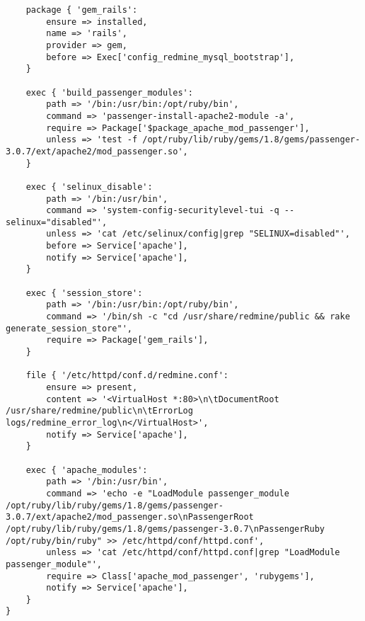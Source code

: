 \begin{code}
\begin{lstlisting}
	package { 'gem_rails':
		ensure => installed,
		name => 'rails',
		provider => gem,
		before => Exec['config_redmine_mysql_bootstrap'],
	}

	exec { 'build_passenger_modules':
		path => '/bin:/usr/bin:/opt/ruby/bin',
		command => 'passenger-install-apache2-module -a',
		require => Package['$package_apache_mod_passenger'],
		unless => 'test -f /opt/ruby/lib/ruby/gems/1.8/gems/passenger-3.0.7/ext/apache2/mod_passenger.so',
	}

	exec { 'selinux_disable':
		path => '/bin:/usr/bin',
		command => 'system-config-securitylevel-tui -q --selinux="disabled"',
		unless => 'cat /etc/selinux/config|grep "SELINUX=disabled"',
		before => Service['apache'],
		notify => Service['apache'],
	}

	exec { 'session_store':
		path => '/bin:/usr/bin:/opt/ruby/bin',
		command => '/bin/sh -c "cd /usr/share/redmine/public && rake generate_session_store"',
		require => Package['gem_rails'],
	}

	file { '/etc/httpd/conf.d/redmine.conf':
		ensure => present,
		content => '<VirtualHost *:80>\n\tDocumentRoot /usr/share/redmine/public\n\tErrorLog logs/redmine_error_log\n</VirtualHost>',
		notify => Service['apache'],
	}

	exec { 'apache_modules':
		path => '/bin:/usr/bin',
		command => 'echo -e "LoadModule passenger_module /opt/ruby/lib/ruby/gems/1.8/gems/passenger-3.0.7/ext/apache2/mod_passenger.so\nPassengerRoot /opt/ruby/lib/ruby/gems/1.8/gems/passenger-3.0.7\nPassengerRuby /opt/ruby/bin/ruby" >> /etc/httpd/conf/httpd.conf',
		unless => 'cat /etc/httpd/conf/httpd.conf|grep "LoadModule passenger_module"',
		require => Class['apache_mod_passenger', 'rubygems'],
		notify => Service['apache'],
	}
}
\end{lstlisting}
\end{code}
%
